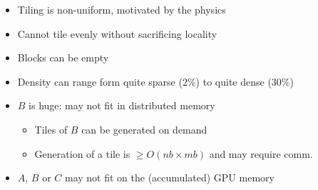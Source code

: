 \begin{frame}[t]
\begin{columns}
    \begin{column}{.5\textwidth}
      \begin{itemize}
      \item Tiling is non-uniform, motivated by the physics
      \item Cannot tile evenly without sacrificing locality
      \item Blocks can be empty
      \item Density can range form quite sparse (2\%) to quite dense (30\%)
      \item $B$ is huge: may not fit in distributed memory
        \begin{itemize}
        \item Tiles of $B$ can be generated on demand
        \item Generation of a tile is $\geq O(nb\times mb)$ and may
          require comm.
        \end{itemize}
      \item $A$, $B$ or $C$ may not fit on the (accumulated) GPU memory
      \end{itemize}
    \end{column}
    \end{columns}
  
\end{frame}


